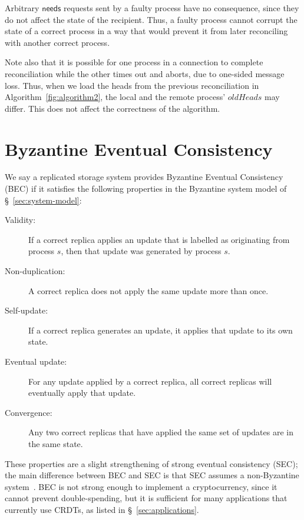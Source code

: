 \documentclass[a4paper,anonymous,USenglish]{lipics-v2019}
\begin{document}
Arbitrary $\mathsf{needs}$ requests sent by a faulty process have no consequence, since they do not affect the state of the recipient.
Thus, a faulty process cannot corrupt the state of a correct process in a way that would prevent it from later reconciling with another correct process.

Note also that it is possible for one process in a connection to complete reconciliation while the other times out and aborts, due to one-sided message loss.
Thus, when we load the heads from the previous reconciliation in Algorithm~\ref{fig:algorithm2}, the local and the remote process' $\mathit{oldHeads}$ may differ.
This does not affect the correctness of the algorithm.

\section{Byzantine Eventual Consistency}\label{sec:byzantine-crdts}

We say a replicated storage system provides Byzantine Eventual Consistency (BEC) if it satisfies the following properties in the Byzantine system model of \S~\ref{sec:system-model}:

\begin{description}
\item[Validity:] If a correct replica applies an update that is labelled as originating from process $s$, then that update was generated by process $s$.
\item[Non-duplication:] A correct replica does not apply the same update more than once.
\item[Self-update:] If a correct replica generates an update, it applies that update to its own state.
\item[Eventual update:] For any update applied by a correct replica, all correct replicas will eventually apply that update.
\item[Convergence:] Any two correct replicas that have applied the same set of updates are in the same state.
\end{description}

These properties are a slight strengthening of strong eventual consistency (SEC); the main difference between BEC and SEC is that SEC assumes a non-Byzantine system~\cite{Shapiro:2011}.
BEC is not strong enough to implement a cryptocurrency, since it cannot prevent double-spending, but it is sufficient for many applications that currently use CRDTs, as listed in \S~\ref{sec:applications}.
\end{document}

